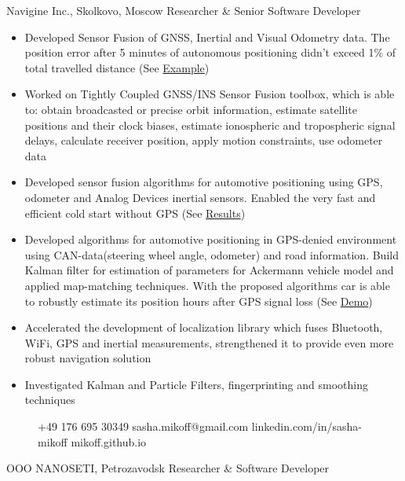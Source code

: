 \documentclass{tccv}
\begin{document}
\begin{eventlist}
\begin{eventlist}
     {\textcolor{blue(ncs)}{N}avigine Inc., Skolkovo, Moscow}
     {Researcher \& Senior Software Developer}
\begin{itemize}
    \item Developed Sensor Fusion of GNSS, Inertial and Visual Odometry data. The position error after 5 minutes of autonomous positioning didn't exceed 1\% of total travelled distance (See  \href{https://www.dropbox.com/s/kaij23xphdqjv5j/kalman_heading_correction_on.html?dl=1}{Example})
    \item Worked on Tightly Coupled GNSS/INS Sensor Fusion toolbox, which is able to: obtain broadcasted or precise orbit information, estimate satellite positions and their clock biases, estimate ionospheric and tropospheric signal delays, calculate receiver position, apply motion constraints, use odometer data
    \item Developed sensor fusion algorithms for automotive positioning using GPS, odometer and Analog Devices inertial sensors. Enabled the very fast and efficient cold start without GPS (See \href{https://www.dropbox.com/s/yjag8qm7ax6skoa/vehicle_positioning_demo.pptx}{Results})
    \item Developed algorithms for automotive positioning in GPS-denied environment using CAN-data(steering wheel angle, odometer) and road information. Build Kalman filter for estimation of parameters for Ackermann vehicle model and applied map-matching techniques. With the proposed algorithms car is able to robustly estimate its position hours after GPS signal loss (See \href{https://www.dropbox.com/s/awil97l95az982h/AutotomotiveCanFusion.png}{Demo})
    \item Accelerated the development of localization library  which fuses Bluetooth, WiFi, GPS and inertial measurements, strengthened it to provide even more robust navigation solution
    \item Investigated Kalman and Particle Filters, fingerprinting and smoothing techniques
\end{itemize}

\begin{figure}[t]
    {+49 176 695 30349}
    {sasha.mikoff@gmail.com}
    {linkedin.com/in/sasha-mikoff}
    {mikoff.github.io}
\end{figure}

     {OOO NANOSETI, Petrozavodsk}
     {Researcher \& Software Developer}
     

\end{eventlist}
\end{eventlist}
\end{document}
